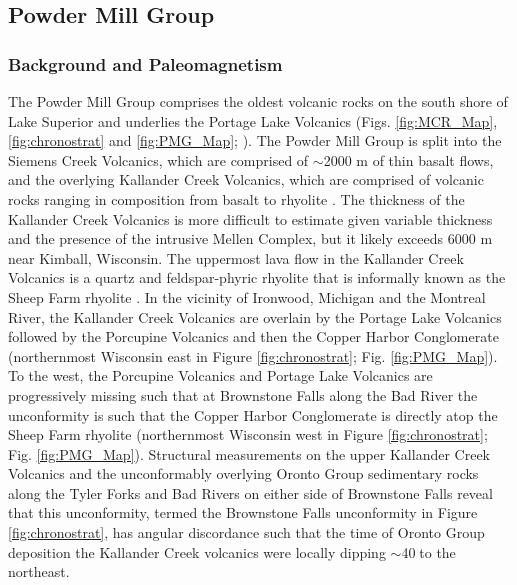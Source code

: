 \documentclass[11pt,letterpaper]{article}
\begin{document}
\subsection{Powder Mill Group}

\subsubsection{Background and Paleomagnetism}

The Powder Mill Group comprises the oldest volcanic rocks on the south shore of Lake Superior and underlies the Portage Lake Volcanics (Figs. \ref{fig:MCR_Map}, \ref{fig:chronostrat} and \ref{fig:PMG_Map}; \citealp{Palmer1986a,Nicholson1997a}). The Powder Mill Group is split into the Siemens Creek Volcanics, which are comprised of $\sim$2000 m of thin basalt flows, and the overlying Kallander Creek Volcanics, which are comprised of volcanic rocks ranging in composition from basalt to rhyolite  \citep{Palmer1986a, Cannon1996a}. The thickness of the Kallander Creek Volcanics is more difficult to estimate given variable thickness and the presence of the intrusive Mellen Complex, but it likely exceeds 6000 m near Kimball, Wisconsin. The uppermost lava flow in the Kallander Creek Volcanics is a quartz and feldspar-phyric rhyolite that is informally known as the Sheep Farm rhyolite \citep{Cannon1996a}. In the vicinity of Ironwood, Michigan and the Montreal River, the Kallander Creek Volcanics are overlain by the Portage Lake Volcanics followed by the Porcupine Volcanics and then the Copper Harbor Conglomerate (northernmost Wisconsin east in Figure \ref{fig:chronostrat}; Fig. \ref{fig:PMG_Map}). To the west, the Porcupine Volcanics and Portage Lake Volcanics are progressively missing such that at Brownstone Falls along the Bad River the unconformity is such that the Copper Harbor Conglomerate is directly atop the Sheep Farm rhyolite (northernmost Wisconsin west in Figure \ref{fig:chronostrat}; Fig. \ref{fig:PMG_Map}). Structural measurements on the upper Kallander Creek Volcanics and the unconformably overlying Oronto Group sedimentary rocks along the Tyler Forks and Bad Rivers on either side of Brownstone Falls reveal that this unconformity, termed the Brownstone Falls unconformity in Figure \ref{fig:chronostrat}, has angular discordance such that the time of Oronto Group deposition the Kallander Creek volcanics were locally dipping $\sim$40\textdegree$\;$to the northeast.
\end{document}
